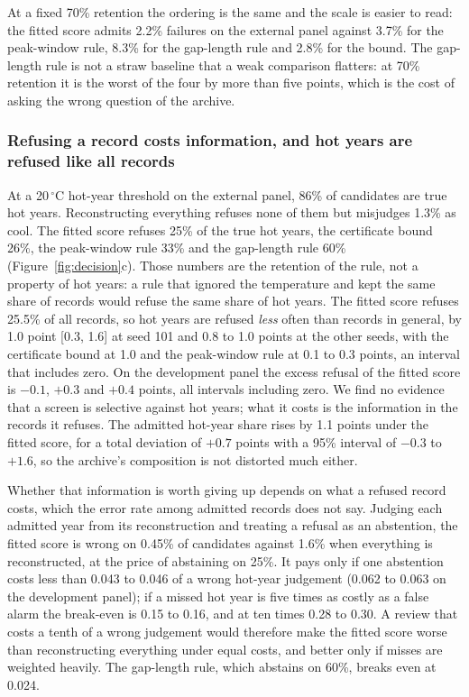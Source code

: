 \documentclass[draft]{agujournal2025}
\begin{document}
At a fixed 70\% retention the ordering is the same and the scale is easier to
read: the fitted score admits 2.2\% failures on the external panel against 3.7\%
for the peak-window rule, 8.3\% for the gap-length rule and 2.8\% for the bound.
The gap-length rule is not a straw baseline that a weak comparison flatters: at
70\% retention it is the worst of the four by more than five points, which is the
cost of asking the wrong question of the archive.

\subsubsection{Refusing a record costs information, and hot years are refused like all records}

At a 20\,$^{\circ}$C hot-year threshold on the external panel, 86\% of candidates
are true hot years. Reconstructing everything refuses none of them but misjudges
1.3\% as cool. The fitted score refuses 25\% of the true hot years, the certificate
bound 26\%, the peak-window rule 33\% and the gap-length rule 60\%
(Figure~\ref{fig:decision}c). Those numbers are the retention of the rule, not a
property of hot years: a rule that ignored the temperature and kept the same share
of records would refuse the same share of hot years. The fitted score refuses 25.5\%
of all records, so hot years are refused \emph{less} often than records in general,
by 1.0 point [0.3, 1.6] at seed 101 and 0.8 to 1.0 points at the other seeds, with
the certificate bound at 1.0 and the peak-window rule at 0.1 to 0.3 points, an
interval that includes zero. On the development panel the excess refusal of the
fitted score is $-0.1$, $+0.3$ and $+0.4$ points, all intervals including zero. We
find no evidence that a screen is selective against hot years; what it costs is
the information in the records it refuses. The admitted hot-year share rises by
1.1 points under the fitted score, for a total deviation of $+0.7$ points with a
95\% interval of $-0.3$ to $+1.6$, so the archive's composition is not distorted
much either.

Whether that information is worth giving up depends on what a refused record
costs, which the error rate among admitted records does not say. Judging each
admitted year from its reconstruction and treating a refusal as an abstention,
the fitted score is wrong on 0.45\% of candidates against 1.6\% when everything
is reconstructed, at the price of abstaining on 25\%. It pays only if one
abstention costs less than 0.043 to 0.046 of a wrong hot-year judgement (0.062
to 0.063 on the development panel); if a missed hot year is five times as costly
as a false alarm the break-even is 0.15 to 0.16, and at ten times 0.28 to 0.30. A review that costs a
tenth of a wrong judgement would therefore make the fitted score worse than
reconstructing everything under equal costs, and better only if misses are
weighted heavily. The gap-length rule, which abstains on 60\%, breaks even at
0.024.
\end{document}
